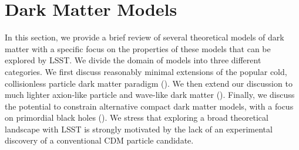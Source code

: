 \chapter{Dark Matter Models}
\label{sec:theory}
\bigskip

In this section, we provide a brief review of several theoretical models of dark matter with a specific focus on the properties of these models that can be explored by LSST. 
We divide the domain of models into three different categories. 
We first discuss reasonably minimal extensions of the popular cold, collisionless particle dark matter paradigm (). 
We then extend our discussion to much lighter axion-like particle and wave-like dark matter (). 
Finally, we discuss the potential to constrain alternative compact dark matter models, with a focus on primordial black holes ().
We stress that exploring a broad theoretical landscape with LSST is strongly motivated by the lack of an experimental discovery of a conventional CDM particle candidate. 




